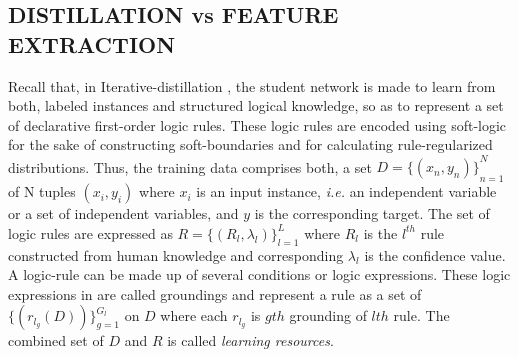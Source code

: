 \documentclass[12pt,a4paper]{article}
\begin{document}
\subsection{DISTILLATION vs FEATURE EXTRACTION}

Recall that, in Iterative-distillation \cite{Hu:2019}, the student network is made to learn from both, labeled instances and structured logical knowledge, so as to represent a set of declarative first-order logic rules. These logic rules are encoded using soft-logic \cite{Bach:2015} for the sake of constructing soft-boundaries and for calculating rule-regularized distributions. Thus, the training data comprises both, a set $D = {\{ (x_n,y_n) \}}_{n=1}^N$ of N tuples $(x_i,y_i)$ where $x_i$ is an input instance, {\it i.e.} an independent variable or a set of independent variables, and $y$ is the corresponding target. The set of logic rules are expressed as \begin{math} R = {\{ (R_l,\lambda_l) \}}_{l=1}^L\end{math} where \begin{math} R_l \end{math} is the \begin{math}l^{th}\end{math} rule constructed from human knowledge and corresponding $\lambda_l$ is the confidence value. A logic-rule can be made up of several conditions or logic expressions. These logic expressions in \cite{Hu:2019} are called groundings and represent a rule as a set of \begin{math}\{ (r_{l_g}(D)) \}_{g=1}^{G_l}\end{math} on \begin{math}D\end{math} where each $r_{l_g}$ is $gth$ grounding of $lth$ rule. The combined set of $D$ and $R$ is called {\it learning resources}.
\vspace{2mm}
\end{document}
